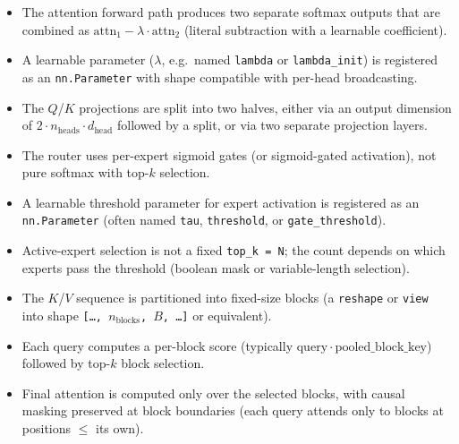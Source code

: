 \begin{itemize}
  \setlength\itemsep{1pt}
  \item[R1.] The attention forward path produces two separate softmax outputs that are combined as $\mathrm{attn}_1 - \lambda \cdot \mathrm{attn}_2$ (literal subtraction with a learnable coefficient).
  \item[R2.] A learnable parameter ($\lambda$, e.g.\ named \texttt{lambda} or \texttt{lambda\_init}) is registered as an \texttt{nn.Parameter} with shape compatible with per-head broadcasting.
  \item[R3.] The $Q$/$K$ projections are split into two halves, either via an output dimension of $2 \cdot n_\mathrm{heads} \cdot d_\mathrm{head}$ followed by a split, or via two separate projection layers.
\end{itemize}

\begin{itemize}
  \setlength\itemsep{1pt}
  \item[R1.] The router uses per-expert sigmoid gates (or sigmoid-gated activation), not pure softmax with top-$k$ selection.
  \item[R2.] A learnable threshold parameter for expert activation is registered as an \texttt{nn.Parameter} (often named \texttt{tau}, \texttt{threshold}, or \texttt{gate\_threshold}).
  \item[R3.] Active-expert selection is not a fixed \texttt{top\_k = N}; the count depends on which experts pass the threshold (boolean mask or variable-length selection).
\end{itemize}

\begin{itemize}
  \setlength\itemsep{1pt}
  \item[R1.] The $K$/$V$ sequence is partitioned into fixed-size blocks (a \texttt{reshape} or \texttt{view} into shape \texttt{[\dots, $n_\mathrm{blocks}$, $B$, \dots]} or equivalent).
  \item[R2.] Each query computes a per-block score (typically $\mathrm{query} \cdot \mathrm{pooled\_block\_key}$) followed by top-$k$ block selection.
  \item[R3.] Final attention is computed only over the selected blocks, with causal masking preserved at block boundaries (each query attends only to blocks at positions $\leq$ its own).
\end{itemize}

